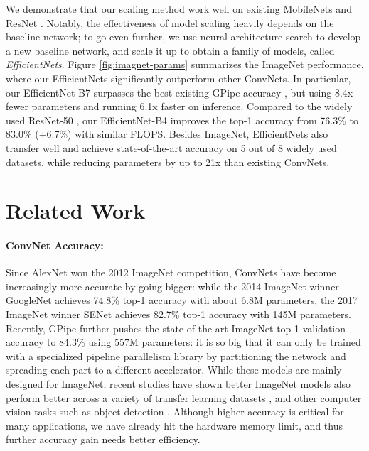 \documentclass{article}
\begin{document}
We demonstrate that our scaling method work well on existing MobileNets \cite{mobilenetv117, mobilenetv218} and ResNet \cite{resnet16}. Notably, the effectiveness of model scaling heavily depends on the baseline network; to go even further, we  use neural architecture search \cite{nas_cifar17,mnas18} to develop a new  baseline network, and scale it up to obtain a family of models, called \emph{EfficientNets}. Figure \ref{fig:imagnet-params} summarizes the ImageNet performance, where our EfficientNets  significantly outperform other ConvNets. In particular, our EfficientNet-B7  surpasses the best existing GPipe accuracy \cite{gpipe18}, but using 8.4x fewer parameters and running 6.1x faster on inference. Compared to the widely used ResNet-50 \cite{resnet16}, our EfficientNet-B4 improves the top-1 accuracy from 76.3\% to 83.0\% (+6.7\%) with similar FLOPS. Besides ImageNet,  EfficientNets also transfer well and achieve state-of-the-art accuracy on 5 out of 8 widely used datasets, while reducing parameters by up to 21x than existing ConvNets.  \section{Related Work}                                                           
 \label{sec:related}
 
\paragraph{ConvNet Accuracy: } Since AlexNet \cite{alexnet12} won the 2012 ImageNet competition, ConvNets have become increasingly more accurate by going bigger: while the 2014 ImageNet winner GoogleNet \cite{googlenet14} achieves 74.8\% top-1 accuracy with about 6.8M parameters,  the 2017 ImageNet winner SENet \cite{senet18} achieves 82.7\% top-1 accuracy with 145M parameters. Recently, GPipe \cite{gpipe18} further pushes the state-of-the-art ImageNet top-1 validation accuracy to 84.3\% using 557M parameters:  it is so big that it can only be trained with a specialized pipeline parallelism library by partitioning the network and spreading each part to a different accelerator. While these models are mainly designed for ImageNet, recent studies have shown better ImageNet models also perform better across a variety of transfer learning datasets \cite{imagenettransfer18}, and other computer vision tasks such as object detection \cite{resnet16,mnas18}. Although higher accuracy is critical for many applications, we have already hit the hardware memory limit, and thus further accuracy gain needs better efficiency.
\end{document}
